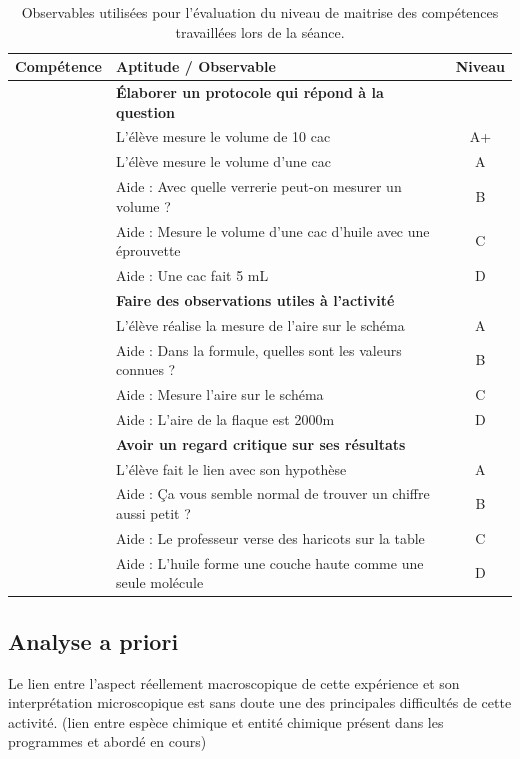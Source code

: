 \documentclass[12pt,a4paper]{article}
\begin{document}
\begin{table}
\center
\begin{tabular}{l|l|c}
\textbf{Compétence} & \textbf{Aptitude} / Observable & \textbf{Niveau} \\
\hline \hline
\anarai 	& \textbf{Élaborer un protocole qui répond à la question} 	& \\
				& L'élève mesure le volume de 10 cac				 						& A+ \\
				& L'élève mesure le volume d'une cac 									& A \\
				& Aide : Avec quelle verrerie peut-on mesurer un volume ?	& B \\
				& Aide : Mesure le volume d'une cac d'huile avec une éprouvette & C \\
				& Aide : Une cac fait 5 mL 															& D \\
\hline
\rea			& \textbf{Faire des observations utiles à l'activité}					& \\
				& L'élève réalise la mesure de l'aire sur le schéma				& A \\
				& Aide : Dans la formule, quelles sont les valeurs connues ? & B \\
				& Aide : Mesure l'aire sur le schéma											& C \\
				& Aide : L'aire de la flaque est \unit{2000}{m\squared}			& D \\
\hline
\val			& \textbf{Avoir un regard critique sur ses résultats}				& \\
				& L'élève fait le lien avec son hypothèse									& A \\
				& Aide : Ça vous semble normal de trouver un chiffre aussi petit ? & B \\
				& Aide : Le professeur verse des haricots sur la table			& C \\
				& Aide : L'huile forme une couche haute comme une seule molécule & D \\
\end{tabular}
\caption{Observables utilisées pour l'évaluation du niveau de maitrise des compétences travaillées lors de la séance.}
\label{tab:obs}
\end{table}

\subsection{Analyse a priori}

Le lien entre l'aspect réellement macroscopique de cette expérience et son interprétation microscopique est sans doute une des principales difficultés de cette activité.
(lien entre espèce chimique et entité chimique présent dans les programmes et abordé en cours)
\end{document}
